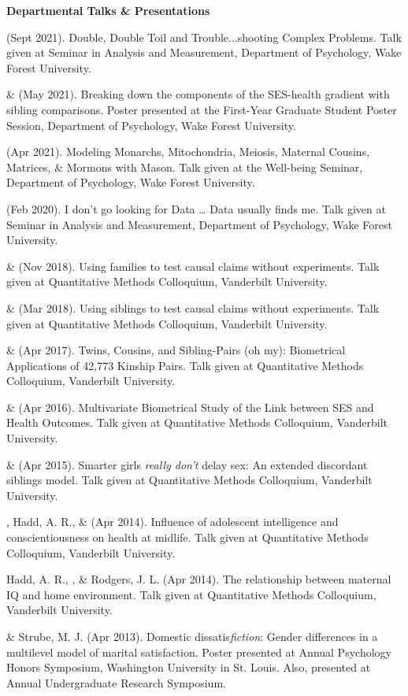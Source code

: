 
{\large \bf Departmental Talks \& Presentations}
\begin{etaremune}
\item \meb (Sept 2021). Double, Double Toil and Trouble...shooting Complex Problems. Talk given at Seminar in Analysis and Measurement, Department of Psychology, Wake Forest University. 
%
\item \yrh \& \meb (May 2021). Breaking down the components of the SES-health gradient with sibling comparisons. Poster presented at the First-Year Graduate Student Poster Session, Department of Psychology, Wake Forest University. 
%
\item\meb (Apr 2021). Modeling Monarchs, Mitochondria, Meiosis, Maternal Cousins, Matrices, \& Mormons with Mason. Talk given at the Well-being Seminar, Department of Psychology, Wake Forest University. 
%
\item\meb (Feb 2020). I don't go looking for Data … Data usually finds me. Talk given at Seminar in Analysis and Measurement, Department of Psychology, Wake Forest University. 
%
\item\meb \& \Joe (Nov 2018). Using families to test causal claims without experiments. Talk given at Quantitative Methods Colloquium, Vanderbilt University. 
%
\item\meb \& \Joe (Mar 2018). Using siblings to test causal claims without experiments. Talk given at Quantitative Methods Colloquium, Vanderbilt University.
%
\item\meb \& \Joe (Apr 2017). Twins, Cousins, and Sibling-Pairs (oh my): Biometrical Applications of 42,773 Kinship Pairs. Talk given at Quantitative Methods Colloquium, Vanderbilt University. %
%
\item\meb \& \Joe (Apr 2016). Multivariate Biometrical Study of the Link between SES and Health Outcomes. Talk given at Quantitative Methods Colloquium, Vanderbilt University.
%
\item\meb \& \Joe (Apr 2015). Smarter girls \textit{really don't} delay sex: An extended discordant siblings model. Talk given at Quantitative Methods Colloquium, Vanderbilt University.
\item\meb, Hadd, A. R., \& \Joe (Apr 2014). Influence of adolescent intelligence and conscientiousness on health at midlife. Talk given at Quantitative Methods Colloquium, Vanderbilt University. 
%
\item Hadd, A. R., \meb, \& Rodgers, J. L. (Apr 2014). The relationship between maternal IQ and home environment. Talk given at Quantitative Methods Colloquium, Vanderbilt University.
%
\item\meb \& Strube, M. J. (Apr 2013). Domestic dissatis{\em fiction}: Gender differences in a multilevel model of marital satisfaction. Poster presented at Annual Psychology Honors Symposium, Washington University in St. Louis. Also, presented at Annual Undergraduate Research Symposium.
\end{etaremune}
